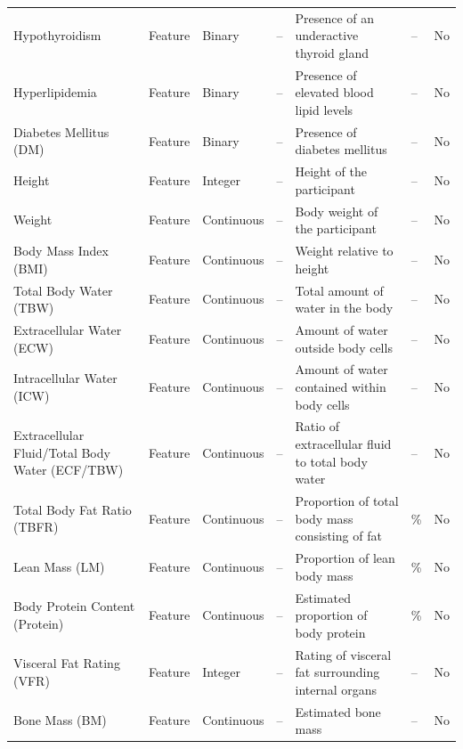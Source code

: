 \begin{longtable}{
    p{4.0cm}
    p{1.3cm}
    p{1.6cm}
    p{1.4cm}
    p{5.0cm}
    p{1.0cm}
    p{1.2cm}
}
Hypothyroidism
& Feature & Binary & --
& Presence of an underactive thyroid gland
& -- & No \\

Hyperlipidemia
& Feature & Binary & --
& Presence of elevated blood lipid levels
& -- & No \\

Diabetes Mellitus (DM)
& Feature & Binary & --
& Presence of diabetes mellitus
& -- & No \\

Height
& Feature & Integer & --
& Height of the participant
& -- & No \\

Weight
& Feature & Continuous & --
& Body weight of the participant
& -- & No \\

Body Mass Index (BMI)
& Feature & Continuous & --
& Weight relative to height
& -- & No \\

Total Body Water (TBW)
& Feature & Continuous & --
& Total amount of water in the body
& -- & No \\

Extracellular Water (ECW)
& Feature & Continuous & --
& Amount of water outside body cells
& -- & No \\

Intracellular Water (ICW)
& Feature & Continuous & --
& Amount of water contained within body cells
& -- & No \\

Extracellular Fluid/Total Body Water (ECF/TBW)
& Feature & Continuous & --
& Ratio of extracellular fluid to total body water
& -- & No \\

Total Body Fat Ratio (TBFR)
& Feature & Continuous & --
& Proportion of total body mass consisting of fat
& \% & No \\

Lean Mass (LM)
& Feature & Continuous & --
& Proportion of lean body mass
& \% & No \\

Body Protein Content (Protein)
& Feature & Continuous & --
& Estimated proportion of body protein
& \% & No \\

Visceral Fat Rating (VFR)
& Feature & Integer & --
& Rating of visceral fat surrounding internal organs
& -- & No \\

Bone Mass (BM)
& Feature & Continuous & --
& Estimated bone mass
& -- & No \\


\end{longtable}
